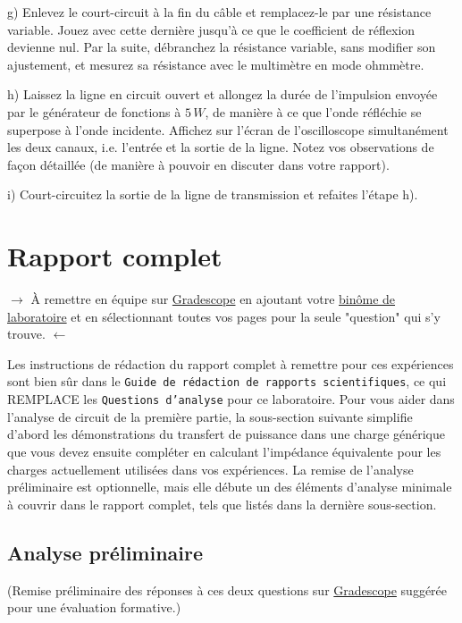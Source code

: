 \documentclass[canadien,12pt,oneside,letterpaper]{article}
\begin{document}
g) Enlevez le court-circuit à la fin du câble et remplacez-le par une résistance variable. Jouez avec cette dernière jusqu'à ce que le coefficient de réflexion devienne nul. Par la suite, débranchez la résistance variable, sans modifier son ajustement, et mesurez sa résistance avec le multimètre en mode ohmmètre.

h) Laissez la ligne en circuit ouvert et allongez la durée de l'impulsion envoyée par le générateur de fonctions à $5\,W$, de manière à ce que l'onde réfléchie se superpose à l'onde incidente. Affichez sur l'écran de l'oscilloscope simultanément les deux canaux, i.e. l'entrée et la sortie de la ligne. Notez vos observations de façon détaillée (de manière à pouvoir en discuter dans votre rapport).

i) Court-circuitez la sortie de la ligne de transmission et refaites l'étape h).


\section{Rapport complet} \label{sec:grade}
\vspace{-0.5cm}
\begin{center}
 $\rightarrow$ À remettre en équipe sur \href{https://www.gradescope.com/}{Gradescope} en ajoutant votre \href{https://help.gradescope.com/article/m5qz2xsnjy-student-add-group-members}{binôme de laboratoire} et en sélectionnant toutes vos pages pour la seule "question" qui s'y trouve. $\leftarrow$
\end{center}

Les instructions de rédaction du rapport complet à remettre pour ces expériences sont bien sûr dans le \texttt{Guide de rédaction de rapports scientifiques}, ce qui REMPLACE les \texttt{Questions d'analyse} pour ce laboratoire. Pour vous aider dans l'analyse de circuit de la première partie, la sous-section suivante simplifie d'abord les démonstrations du transfert de puissance dans une charge générique que vous devez ensuite compléter en calculant l'impédance équivalente pour les charges actuellement utilisées dans vos expériences. La remise de l'analyse préliminaire est optionnelle, mais elle débute un des éléments d'analyse minimale à couvrir dans le rapport complet, tels que listés dans la dernière sous-section.

\subsection{Analyse préliminaire}
\vspace{-0.5cm}
\noindent(Remise préliminaire des réponses à ces deux questions sur \href{https://www.gradescope.com/}{Gradescope} suggérée pour une évaluation formative.)
\end{document}
